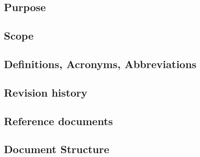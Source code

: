 \subsection{Purpose}
\subsection{Scope}
\subsection{Definitions, Acronyms, Abbreviations}
\subsection{Revision history}
\subsection{Reference documents}
\subsection{Document Structure}